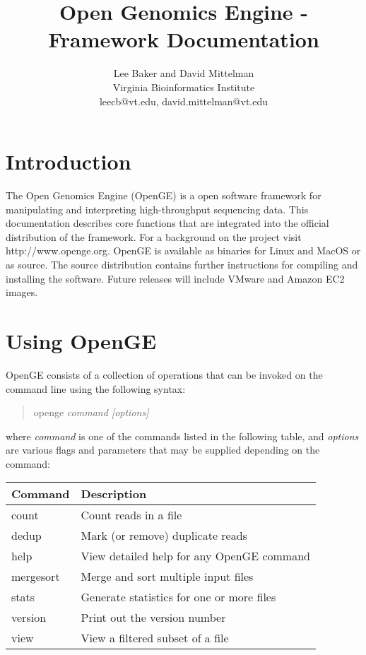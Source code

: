 \documentclass[11pt]{article}
\newcommand {\cmd}[1] {\begin{quote}#1\end{quote}}
\begin{document}
\title{Open Genomics Engine - Framework Documentation}
\author{Lee Baker and David Mittelman\\
Virginia Bioinformatics Institute \\
leecb@vt.edu, david.mittelman@vt.edu}
\maketitle

\section {Introduction}
The Open Genomics Engine (OpenGE) is a open software framework for manipulating and interpreting high-throughput sequencing data. This documentation describes core functions that are integrated into the official distribution of the framework. For a background on the project visit http://www.openge.org. OpenGE is available as binaries for Linux and MacOS or as source. The source distribution contains further instructions for compiling and installing the software. Future releases will include VMware and Amazon EC2 images.
\section {Using OpenGE}
OpenGE consists of a collection of operations that can be invoked on the command line using the following syntax:

\cmd{openge \textit{command [options]}}

where \textit{command} is one of the commands listed in the following table, and \textit{options} are various flags and parameters that may be supplied depending on the command:

\begin{center}
\begin{tabular}{lp{3.5in}}
\hline
Command&Description\\ \hline
count&Count reads in a file\\
dedup&Mark (or remove) duplicate reads\\
help&View detailed help for any OpenGE command\\
mergesort&Merge and sort multiple input files\\
stats&Generate statistics for one or more files\\
version&Print out the version number\\
view&View a filtered subset of a file\\
\end{tabular}
\end{center}
\end{document}
